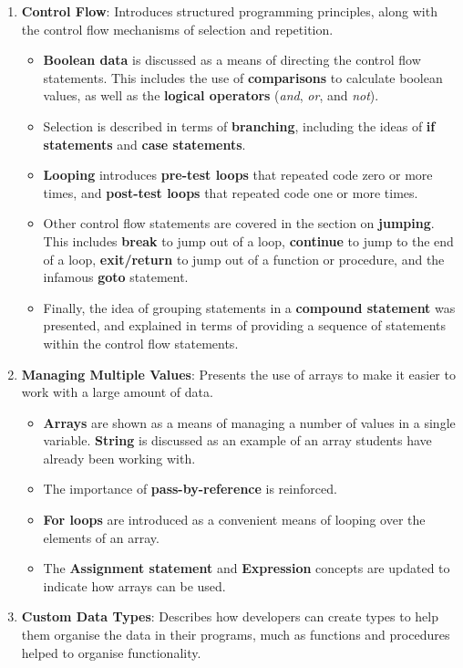 \begin{enumerate}
\begin{itemize}
  \end{itemize}
  \item \textbf{Control Flow}: Introduces structured programming principles, along with the control flow mechanisms of selection and repetition.
  \begin{itemize}[noitemsep,nolistsep]
    \item \textbf{Boolean data} is discussed as a means of directing the control flow statements. This includes the use of \textbf{comparisons} to calculate boolean values, as well as the \textbf{logical operators} (\emph{and}, \emph{or}, and \emph{not}).
    \item Selection is described in terms of \textbf{branching}, including the ideas of \textbf{if statements} and \textbf{case statements}.
    \item \textbf{Looping} introduces \textbf{pre-test loops} that repeated code zero or more times, and \textbf{post-test loops} that repeated code one or more times. 
    \item Other control flow statements are covered in the section on \textbf{jumping}. This includes \textbf{break} to jump out of a loop, \textbf{continue} to jump to the end of a loop, \textbf{exit/return} to jump out of a function or procedure, and the infamous \textbf{goto} statement.
    \item Finally, the idea of grouping statements in a \textbf{compound statement} was presented, and explained in terms of providing a sequence of statements within the control flow statements.
  \end{itemize}
  \item \textbf{Managing Multiple Values}: Presents the use of arrays to make it easier to work with a large amount of data.
  \begin{itemize}[noitemsep,nolistsep]
    \item \textbf{Arrays} are shown as a means of managing a number of values in a single variable. \textbf{String} is discussed as an example of an array students have already been working with.
    \item The importance of \textbf{pass-by-reference} is reinforced.
    \item \textbf{For loops} are introduced as a convenient means of looping over the elements of an array. 
    \item The \textbf{Assignment statement} and \textbf{Expression} concepts are updated to indicate how arrays can be used.
  \end{itemize}
  \item \textbf{Custom Data Types}: Describes how developers can create types to help them organise the data in their programs, much as functions and procedures helped to organise functionality.

\end{enumerate}
